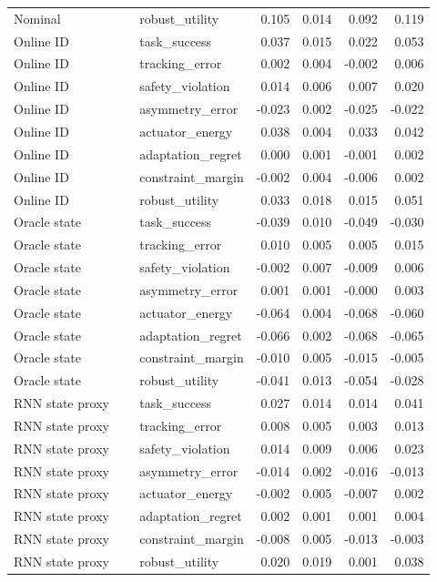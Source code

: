 \documentclass{article}
\begin{document}
\begin{center}
\begin{longtable}{p{0.31\linewidth}p{0.23\linewidth}rrrr}
Nominal & robust\_utility & 0.105 & 0.014 & 0.092 & 0.119\\
Online ID & task\_success & 0.037 & 0.015 & 0.022 & 0.053\\
Online ID & tracking\_error & 0.002 & 0.004 & -0.002 & 0.006\\
Online ID & safety\_violation & 0.014 & 0.006 & 0.007 & 0.020\\
Online ID & asymmetry\_error & -0.023 & 0.002 & -0.025 & -0.022\\
Online ID & actuator\_energy & 0.038 & 0.004 & 0.033 & 0.042\\
Online ID & adaptation\_regret & 0.000 & 0.001 & -0.001 & 0.002\\
Online ID & constraint\_margin & -0.002 & 0.004 & -0.006 & 0.002\\
Online ID & robust\_utility & 0.033 & 0.018 & 0.015 & 0.051\\
Oracle state & task\_success & -0.039 & 0.010 & -0.049 & -0.030\\
Oracle state & tracking\_error & 0.010 & 0.005 & 0.005 & 0.015\\
Oracle state & safety\_violation & -0.002 & 0.007 & -0.009 & 0.006\\
Oracle state & asymmetry\_error & 0.001 & 0.001 & -0.000 & 0.003\\
Oracle state & actuator\_energy & -0.064 & 0.004 & -0.068 & -0.060\\
Oracle state & adaptation\_regret & -0.066 & 0.002 & -0.068 & -0.065\\
Oracle state & constraint\_margin & -0.010 & 0.005 & -0.015 & -0.005\\
Oracle state & robust\_utility & -0.041 & 0.013 & -0.054 & -0.028\\
RNN state proxy & task\_success & 0.027 & 0.014 & 0.014 & 0.041\\
RNN state proxy & tracking\_error & 0.008 & 0.005 & 0.003 & 0.013\\
RNN state proxy & safety\_violation & 0.014 & 0.009 & 0.006 & 0.023\\
RNN state proxy & asymmetry\_error & -0.014 & 0.002 & -0.016 & -0.013\\
RNN state proxy & actuator\_energy & -0.002 & 0.005 & -0.007 & 0.002\\
RNN state proxy & adaptation\_regret & 0.002 & 0.001 & 0.001 & 0.004\\
RNN state proxy & constraint\_margin & -0.008 & 0.005 & -0.013 & -0.003\\
RNN state proxy & robust\_utility & 0.020 & 0.019 & 0.001 & 0.038\\

\end{longtable}
\end{center}
\end{document}
